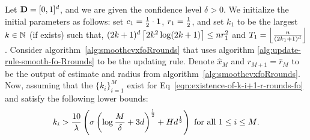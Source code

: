 %
%
\begin{proposition}
\label{proposition:first-order-smooth-r-rounds}
Let $\mathbf{D} = [0, 1]^d$, and we are given the confidence level $\delta > 0$. 
We initialize the initial parameters as follows: set $c_1 = \frac{1}{2} \cdot \mathbf{1}$, 
$r_1 = \frac{1}{2}$, and set $k_1$ to be the largest $k \in \mathbb{N}$ (if exists) such that, 
$(2k + 1)^d \left\lceil{2k^2 \log (2k+1)}\right\rceil \leq nr_1^2$ and $T_1 = \left\lfloor{\frac{n}{(2k_1 +1)^d}}\right\rfloor$.
Consider algorithm~\ref{alg:smoothcvxfoRrounds} that uses algorithm
\ref{alg:update-rule-smooth-fo-Rrounds} to be the updating rule. Denote 
$\hat{x}_M$ and $r_{M+1} = \hat{r}_M$ to be the output of estimate and radius
from algorithm~\ref{alg:smoothcvxfoRrounds}. Now, assuming that the 
$\{k_i\}_{i=1}^M$ exist for Eq~\eqref{eqn:existence-of-k-i+1-r-rounds-fo} 
and satisfy the following lower bounds: 
\begin{equation}
\label{eqn:lower-bound-on-k-i-fo}
k_i > \frac{10}{\lambda} \left(\sigma \left(\log \frac{M}{\delta} + 3d\right)^{\frac{1}{2}}+Hd^{\frac{1}{2}}\right)
	~\text{for all $1\leq i\leq M$}. 
\end{equation}

\end{proposition}
